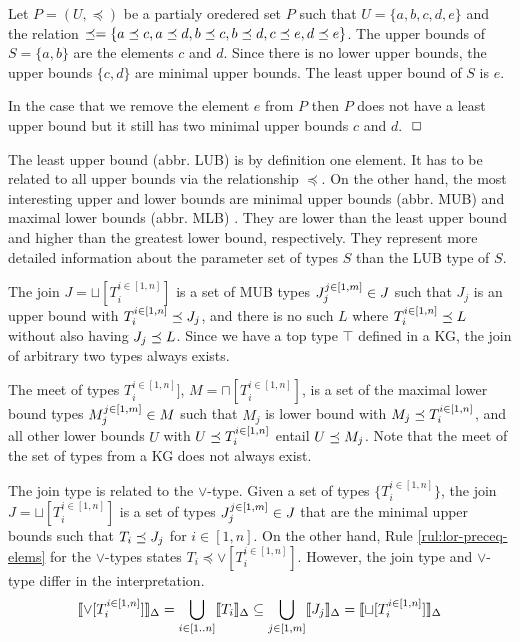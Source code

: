 \documentclass[runningheads]{llncs}
\newcommand{\llb}{\llbracket}
\newcommand{\rrb}{\rrbracket}
\newcommand{\finbox}{\phantom{.}\hfill\Box}
\begin{document}
\begin{example}
  Let $P=(U,\preceq)$ be a partialy oredered set $P$ such that
  $U=\{a,b,c,d,e\}$ and the relation
  $\preceq=\{a\preceq\/c,a\preceq\/d,b\preceq\/c,b\preceq\/d,c\preceq\/e,d\preceq\/e\}$.
  The upper bounds of $S=\{a,b\}$ are the elements $c$ and $d$. Since
  there is no lower upper bounds, the upper bounds $\{c,d\}$ are
  minimal upper bounds. The least upper bound of $S$ is $e$.

  In the case that we remove the element $e$ from $P$ then $P$ does
  not have a least upper bound but it still has two minimal upper
  bounds $c$ and $d$. $\finbox$
\end{example}

The least upper bound (abbr. LUB) is by definition one element. It has
to be related to all upper bounds via the relationship $\preceq$.  On
the other hand, the most interesting upper and lower bounds are
minimal upper bounds (abbr. MUB) and maximal lower bounds (abbr. MLB)
\cite{Knudstorp2024}. They are lower than the least upper bound and
higher than the greatest lower bound, respectively. They represent
more detailed information about the parameter set of types $S$ than
the LUB type of $S$.

The join $J=\sqcup[T_i^{i\in[1,n]}]$ is a set of MUB types
$J_j^{j\in[1,m]}\in\/J$ such that $J_j$ is an upper bound with
$T_i^{i\in[1,n]}\preceq\/J_j$, and there is no such $L$ where
$T_i^{i\in[1,n]}\preceq\/L$ without also having $J_j\preceq\/L$. Since
we have a top type $\top$ defined in a KG, the join of arbitrary two
types always exists.

The meet of types $T_i^{i\in[1,n]}]$, $M=\sqcap[T_i^{i\in[1,n]}]$, is
a set of the maximal lower bound types $M_j^{j\in[1,m]}\in\/M$ such
that $M_j$ is lower bound with $M_j\preceq\/T_i^{i\in[1,n]}$, and all
other lower bounds $U$ with $U\preceq\/T_i^{i\in[1,n]}$ entail
$U\preceq\/M_j$. Note that the meet of the set of types from a KG does
not always exist.

The join type is related to the $\lor$-type. Given a set of types
$\{T_i^{i\in[1,n]}\}$, the join $J=\sqcup[T_i^{i\in[1,n]}]$ is a set
of types $J_j^{j\in[1,m]}\in\/J$ that are the minimal upper bounds
such that $T_i\preceq\/J_j$ for $i\in[1,n]$. On the other hand,
Rule \ref{rul:lor-preceq-elems} for the $\lor$-types states
$T_i\preceq\lor[T_i^{i\in[1,n]}]$. However, the join type and
$\lor$-type differ in the interpretation.
$$\llb\lor[T_i^{i\in[1,n]}]\rrb_\D=\bigcup_{i\in[1..n]}\llb\/T_i\rrb_\D\subseteq\bigcup_{j\in[1,m]}\llb\/J_j\rrb_\D=\llb\sqcup[T_i^{i\in[1,n]}]\rrb_\D$$
\end{document}
